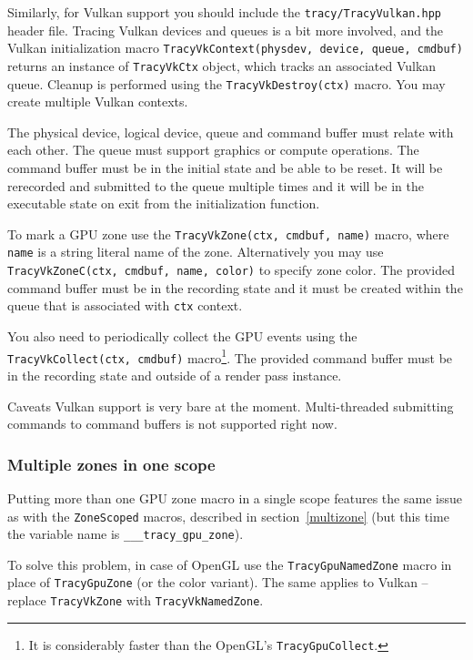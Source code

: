 \documentclass[hidelinks,titlepage,a4paper]{article}
\begin{document}
Similarly, for Vulkan support you should include the \texttt{tracy/TracyVulkan.hpp} header file. Tracing Vulkan devices and queues is a bit more involved, and the Vulkan initialization macro \texttt{TracyVkContext(physdev, device, queue, cmdbuf)} returns an instance of \texttt{TracyVkCtx} object, which tracks an associated Vulkan queue. Cleanup is performed using the \texttt{TracyVkDestroy(ctx)} macro. You may create multiple Vulkan contexts.

The physical device, logical device, queue and command buffer must relate with each other. The queue must support graphics or compute operations. The command buffer must be in the initial state and be able to be reset. It will be rerecorded and submitted to the queue multiple times and it will be in the executable state on exit from the initialization function.

To mark a GPU zone use the \texttt{TracyVkZone(ctx, cmdbuf, name)} macro, where \texttt{name} is a string literal name of the zone. Alternatively you may use \texttt{TracyVkZoneC(ctx, cmdbuf, name, color)} to specify zone color. The provided command buffer must be in the recording state and it must be created within the queue that is associated with \texttt{ctx} context.

You also need to periodically collect the GPU events using the \texttt{TracyVkCollect(ctx, cmdbuf)} macro\footnote{It is considerably faster than the OpenGL's \texttt{TracyGpuCollect}.}. The provided command buffer must be in the recording state and outside of a render pass instance.

\begin{bclogo}[
noborder=true,
couleur=black!5,
logo=\bcattention
]{Caveats}
Vulkan support is very bare at the moment. Multi-threaded submitting commands to command buffers is not supported right now.
\end{bclogo}

\subsubsection{Multiple zones in one scope}

Putting more than one GPU zone macro in a single scope features the same issue as with the \texttt{ZoneScoped} macros, described in section~\ref{multizone} (but this time the variable name is \texttt{\_\_\_tracy\_gpu\_zone}).

To solve this problem, in case of OpenGL use the \texttt{TracyGpuNamedZone} macro in place of \texttt{TracyGpuZone} (or the color variant). The same applies to Vulkan -- replace \texttt{TracyVkZone} with \texttt{TracyVkNamedZone}.
\end{document}
